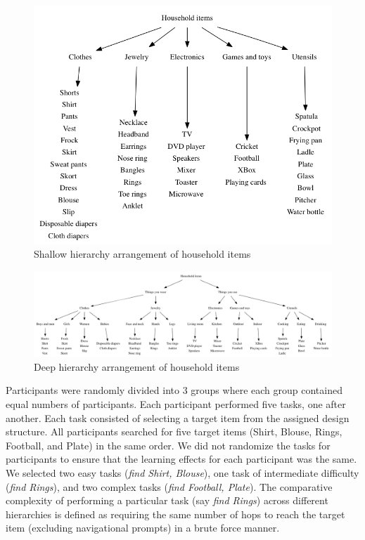 \documentclass{sigchi}
\begin{document}
\begin{figure}[!h]
\centering
\includegraphics[width=0.9\columnwidth]{ShallowHierarchy}
\caption{Shallow hierarchy arrangement of household items}
\label{fig: Figure1}
\end{figure}

\begin{figure}[!h]
\centering
\includegraphics[width=0.9\columnwidth]{DeepHierarchy}
\caption{Deep hierarchy arrangement of household items}
\label{fig: Figure2}
\end{figure}

Participants were randomly divided into 3 groups where each group contained equal numbers of participants. Each participant performed five tasks, one after another. Each task consisted of selecting a target item from the assigned design structure. All participants searched for five target items (Shirt, Blouse, Rings, Football, and Plate) in the same order. We did not randomize the tasks for participants to ensure that the learning effects for each participant was the same. We selected two easy tasks (\textit{find Shirt, Blouse}), one task of intermediate difficulty (\textit{find Rings}), and two complex tasks (\textit{find Football, Plate}). The comparative complexity of performing a particular task (say \textit{find Rings}) across different hierarchies is defined as requiring the same number of hops to reach the target item (excluding navigational prompts) in a brute force manner.  
\end{document}
